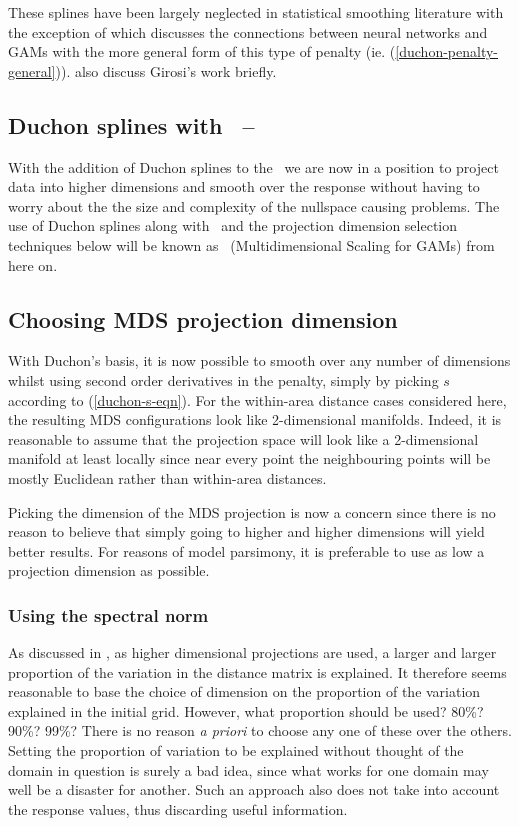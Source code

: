 These splines have been largely neglected in statistical smoothing literature with the exception of  which discusses the connections between neural networks and GAMs with the more general form of this type of penalty (ie. (\ref{duchon-penalty-general})).  also discuss Girosi's work briefly.

\subsection{Duchon splines with \mdsap\ -- \mdsds}

With the addition of Duchon splines to the \mdsap\ we are now in a position to project data into higher dimensions and smooth over the response without having to worry about the the size and complexity of the nullspace causing problems. The use of Duchon splines along with \mdsap\ and the projection dimension selection techniques below will be known as \mdsds\ (Multidimensional Scaling for GAMs) from here on.

\subsection{Choosing MDS projection dimension}

With Duchon's basis, it is now possible to smooth over any number of dimensions whilst using second order derivatives in the penalty, simply by picking $s$ according to (\ref{duchon-s-eqn}). For the within-area distance cases considered here, the resulting MDS configurations look like 2-dimensional manifolds. Indeed, it is reasonable to assume that the projection space will look like a 2-dimensional manifold at least locally since near every point the neighbouring points will be mostly Euclidean rather than within-area distances. 

Picking the dimension of the MDS projection is now a concern since there is no reason to believe that simply going to higher and higher dimensions will yield better results. For reasons of model parsimony, it is preferable to use as low a projection dimension as possible.

\subsubsection{Using the spectral norm}

As discussed in , as higher dimensional projections are used, a larger and larger proportion of the variation in the distance matrix is explained. It therefore seems reasonable to base the choice of dimension on the proportion of the variation explained in the initial grid. However, what proportion should be used? 80\%? 90\%? 99\%? There is no reason \textit{a priori} to choose any one of these over the others. Setting the proportion of variation to be explained without thought of the domain in question is surely a bad idea, since what works for one domain may well be a disaster for another. Such an approach also does not take into account the response values, thus discarding useful information.

